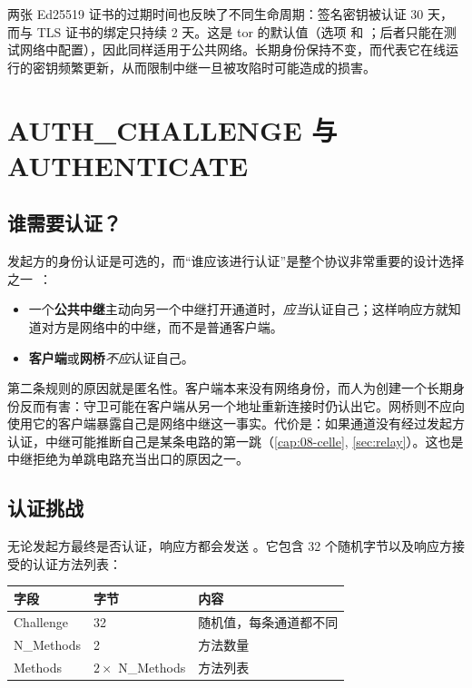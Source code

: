 两张 Ed25519 证书的过期时间也反映了不同生命周期：签名密钥被认证 30 天，而与 TLS 证书的绑定只持续 2 天。这是 tor 的默认值（选项  和 ；后者只能在测试网络中配置），因此同样适用于公共网络。长期身份保持不变，而代表它在线运行的密钥频繁更新，从而限制中继一旦被攻陷时可能造成的损害。

\section{AUTH\_CHALLENGE 与 AUTHENTICATE}\label{sec:canale-authenticate}

\subsection{谁需要认证？}

发起方的身份认证是可选的，而“谁应该进行认证”是整个协议非常重要的设计选择之一~：
\begin{itemize}
  \item 一个\textbf{公共中继}主动向另一个中继打开通道时，\emph{应当}认证自己；这样响应方就知道对方是网络中的中继，而不是普通客户端。
  \item \textbf{客户端}或\textbf{网桥}\emph{不应}认证自己。
\end{itemize}

第二条规则的原因就是匿名性。客户端本来没有网络身份，而人为创建一个长期身份反而有害：守卫可能在客户端从另一个地址重新连接时仍认出它。网桥则不应向使用它的客户端暴露自己是网络中继这一事实。代价是：如果通道没有经过发起方认证，中继可能推断自己是某条电路的第一跳（\cref{cap:08-celle}, \cref{sec:relay}）。这也是中继拒绝为单跳电路充当出口的原因之一。

\subsection{认证挑战}

无论发起方最终是否认证，响应方都会发送 。它包含 32 个随机字节以及响应方接受的认证方法列表：

\begin{center}
\begin{tabular}{lll}
\toprule
字段 & 字节 & 内容 \\
\midrule
Challenge & 32 & 随机值，每条通道都不同 \\
N\_Methods & 2 & 方法数量 \\
Methods & $2 \times$ N\_Methods & 方法列表 \\
\bottomrule
\end{tabular}
\end{center}

